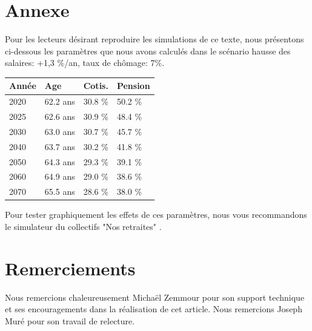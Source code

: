 \documentclass[10pt]{article}
\begin{document}

\section{Annexe}

Pour les lecteurs désirant reproduire les simulations de ce texte, 
nous présentons ci-dessous les paramètres que nous avons calculés dans 
le scénario hausse des salaires: +1,3 \%/an, taux de chômage: 7\%.

\begin{center}
\begin{tabular}{l|lll}
\textbf{Année} & \textbf{Age} & \textbf{Cotis.} & \textbf{Pension} \\
\hline
2020 & 62.2 ans & 30.8 \% & 50.2 \% \\
2025 & 62.6 ans & 30.9 \% & 48.4 \% \\
2030 & 63.0 ans & 30.7 \% & 45.7 \% \\
2040 & 63.7 ans & 30.2 \% & 41.8 \% \\
2050 & 64.3 ans & 29.3 \% & 39.1 \% \\
2060 & 64.9 ans & 29.0 \% & 38.6 \% \\
2070 & 65.5 ans & 28.6 \% & 38.0 \%
\end{tabular}
\end{center}

Pour tester graphiquement les effets de ces paramètres, nous vous recommandons le 
simulateur du collectifs "Nos retraites" \cite{SimulateurNoRetraites}. 


\section{Remerciements}

Nous remercions chaleureusement Michaël Zemmour pour son support 
technique et ses encouragements dans la réalisation de cet article. 
Nous remercions Joseph Muré pour son travail de relecture. 



\end{document}
